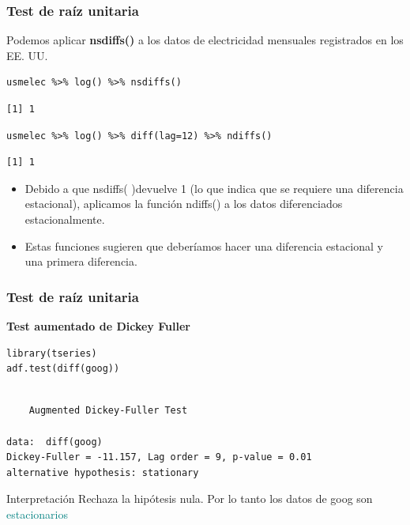 \documentclass[10pt]{beamer}
\begin{document}
\begin{frame}[fragile]
\frametitle{Test de raíz unitaria}


Podemos aplicar \textbf{nsdiffs()} a los datos de electricidad mensuales registrados en los EE. UU.


\lstset{language=r,label= ,caption= ,captionpos=b,numbers=none}
\begin{lstlisting}
usmelec %>% log() %>% nsdiffs()
\end{lstlisting}


{\scriptsize
\begin{verbatim}
[1] 1
\end{verbatim}
}


\lstset{language=r,label= ,caption= ,captionpos=b,numbers=none}
\begin{lstlisting}
usmelec %>% log() %>% diff(lag=12) %>% ndiffs()
\end{lstlisting}


{\scriptsize
\begin{verbatim}
[1] 1
\end{verbatim}
}


\begin{itemize}
\item Debido a que nsdiffs( )devuelve 1 (lo que indica que se requiere una diferencia estacional), aplicamos la función ndiffs() a los datos diferenciados estacionalmente. 

\item Estas funciones sugieren que deberíamos hacer una diferencia estacional y una primera diferencia.
\end{itemize}




\end{frame}






\begin{frame}[fragile]
\frametitle{Test de raíz unitaria}

\textbf{Test aumentado de Dickey Fuller}

\lstset{language=r,label= ,caption= ,captionpos=b,numbers=none}
\begin{lstlisting}
library(tseries)
adf.test(diff(goog))
\end{lstlisting}

\pause

{\scriptsize
\begin{verbatim}

	Augmented Dickey-Fuller Test

data:  diff(goog)
Dickey-Fuller = -11.157, Lag order = 9, p-value = 0.01
alternative hypothesis: stationary

\end{verbatim}
}

\pause

{\small
\begin{block}{Interpretación}
Rechaza la hipótesis nula. Por lo tanto los datos de goog son \textcolor{teal}{estacionarios}
\end{block}
}


\end{frame}
\end{document}
